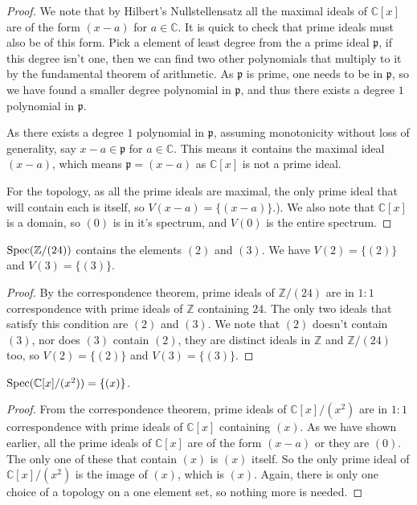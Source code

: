 \begin{proof}
    We note that by Hilbert's Nullstellensatz all the maximal ideals of $\mathbb{C}[x]$ are of the form $(x-a)$ for $a \in \mathbb{C}$. It is quick to check that prime ideals must also be of this form. Pick a element of least degree from the a prime ideal $\mathfrak{p}$, if this degree isn't one, then we can find two other polynomials that multiply to it by the fundamental theorem of arithmetic. As $\mathfrak{p}$ is prime, one needs to be in $\mathfrak{p}$, so we have found a smaller degree polynomial in $\mathfrak{p}$, and thus there exists a degree $1$ polynomial in $\mathfrak{p}$.

    As there exists a degree $1$ polynomial in $\mathfrak{p}$, assuming monotonicity without loss of generality, say $x - a \in \mathfrak{p}$ for $a \in \mathbb{C}$. This means it contains the maximal ideal $(x-a)$, which means $\mathfrak{p} = (x-a)$ as $\mathbb{C}[x]$ is not a prime ideal. 

    For the topology, as all the prime ideals are maximal, the only prime ideal that will contain each is itself, so $V(x-a) = \{(x-a)\}$.). We also note that $\mathbb{C}[x]$ is a domain, so $(0)$ is in it's spectrum, and $V(0)$ is the entire spectrum.
\end{proof}
\begin{example}
  $\operatorname{Spec} (\mathbb{Z}/(24))$ contains the elements $(2)$ and $(3)$.
  We have $V(2) = \{(2)\}$ and $V(3) = \{(3)\}$.
\end{example}
\begin{proof}
    By the correspondence theorem, prime ideals of $\mathbb{Z}/(24)$ are in $1:1$ correspondence with prime ideals of $\mathbb{Z}$ containing $24$. The only two ideals that satisfy this condition are $(2)$ and $(3)$. We note that $(2)$ doesn't contain $(3)$, nor does $(3)$ contain $(2)$, they are distinct ideals in $\mathbb{Z}$ and $\mathbb{Z}/(24)$ too, so $V(2) = \{(2)\}$ and $V(3) = \{(3)\}$.
\end{proof}
\begin{example}
    $\operatorname{Spec} (\mathbb{C}[x] / (x^2)) = \{ (x) \}$.
\end{example}
\begin{proof}
    From the correspondence theorem, prime ideals of $\mathbb{C}[x]/(x^2)$ are in $1:1$ correspondence with prime ideals of $\mathbb{C}[x]$ containing $(x)$. As we have shown earlier, all the prime ideals of $\mathbb{C}[x]$ are of the form $(x-a)$ or they are $(0)$. The only one of these that contain $(x)$ is $(x)$ itself. So the only prime ideal of $\mathbb{C}[x]/(x^2)$ is the image of $(x)$, which is $(x)$. Again, there is only one choice of a topology on a one element set, so nothing more is needed.
\end{proof}
